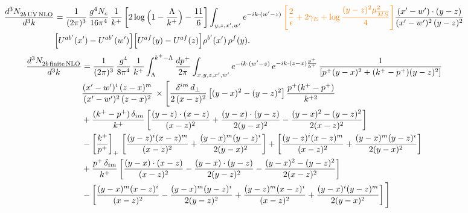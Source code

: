 \documentclass[9pt]{article}
\numberwithin{equation}{section}
\begin{document}
\begin{align}
\frac{d^{3}N_{2b\,\rm UV\, NLO}^{\rm}}{d^{3}k} & = \frac{1}{(2\pi)^{3}}\,\frac{g^{4}N_{c}}{16\pi^{4}}\,\frac{1}{k^{+}}
\left[2\log\Big(1-\frac{\Lambda}{k^{+}}\Big)-\frac{11}{6}\right]\int_{y,z,x',w'}e^{-ik\cdot(w'-z)}\, {\color{orange}\left[\frac{2}{\epsilon}+2\gamma_{E}+\log\frac{(y-z)^{2}\mu^{2}_{\overline{MS}}}{4}\right]}
\frac{(x'-w')\cdot(y-z)}{(x'-w')^{2}\,(y-z)^{2}}\notag \\ &  \Big[U^{ab'}(x')-U^{ab'}(w')\Big]\Big[U^{af}(y)-U^{af}(z)\Big]\rho^{b'}(x')\,\rho^{f}(y).
\end{align}
\begin{align}
    \frac{d^{3}N_{2b\,\rm finite\, NLO}^{\rm}}{d^{3}k} & = \frac{1}{(2\pi)^{3}}\,\frac{g^{4}}{8\pi^{4}}\,\frac{1}{k^{+}}\int_{\Lambda}^{k^{+}-\Lambda}\frac{dp^{+}}{2\pi}\int_{x,y,z,x',w'}e^{-ik\cdot(w'-z)}\,e^{-ik\cdot(z-x)\frac{p^{+}}{k^{+}}}\,\frac{1}{\left[p^{+}(y-x)^{2}+(k^{+}-p^{+})(y-z)^{2}\right]}\notag \\ & \frac{(x'-w')^{i}\,(z-x)^{m}}{(x'-w')^{2}\,(z-x)^{2}}\,\times\Bigg[\frac{\delta^{im}\,d_{\perp}}{2\,(x-z)^{2}}\left[(y-x)^{2}-(y-z)^{2}\right]\frac{p^{+}(k^{+}-p^{+})}{k^{+2}}
\notag \\ & +\frac{(k^{+}-p^{+})\,\delta_{im}}{k^{+}}\left[\frac{(y-z)\cdot(x-z)}{(x-z)^{2}}+\frac{(y-x)\cdot(y-z)}{2(y-x)^{2}}-\frac{(y-x)^{2}-(y-z)^{2}}{2(x-z)^{2}}\right]\notag\\
&-\left[\frac{k^{+}}{p^{+}}\right]_{+}\,\left[\frac{(y-z)^{i}(x-z)^{m}}{(x-z)^{2}}+\frac{(y-x)^{m}(y-z)^{i}}{2(y-x)^{2}}\right]+\left[\frac{(y-z)^{i}(x-z)^{m}}{(x-z)^{2}}+\frac{(y-x)^{m}(y-z)^{i}}{2(y-x)^{2}}\right]\notag\\
&+\frac{p^{+}\,\delta_{im}}{k^{+}}\left[\frac{(y-x)\cdot(x-z)}{(x-z)^{2}}-\frac{(y-x)\cdot(y-z)}{2(y-z)^{2}}-\frac{(y-x)^{2}-(y-z)^{2}}{2(x-z)^{2}}\right]\notag\\
&-\left[\frac{(y-x)^{m}(x-z)^{i}}{(x-z)^{2}}-\frac{(y-x)^{m}(y-z)^{i}}{2(y-z)^{2}}+\frac{(y-z)^{m}(x-z)^{i}}{(x-z)^{2}}+\frac{(y-x)^{i}(y-z)^{m}}{2(y-x)^{2}}\right]\Bigg]\notag\\

\end{align}
\end{document}
